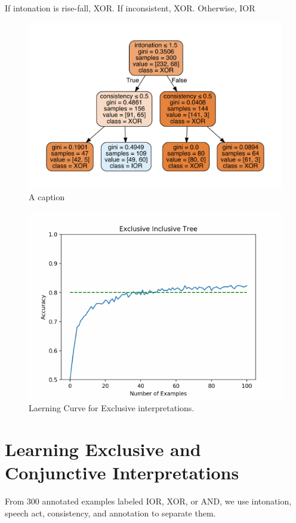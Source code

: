 \documentclass[oneside]{report}
\theoremstyle{definition}
\theoremstyle{definition}
\theoremstyle{definition}
\theoremstyle{remark}
\begin{document}
If intonation is rise-fall, XOR. \newline
If inconsistent, XOR. \newline
Otherwise, IOR \newline
\begin{figure}[tb]
\includegraphics[width=0.6\linewidth]{decision_trees/plots/exin} \caption{A caption}\label{fig:exorTree}
\end{figure}
\begin{figure}[tb]

{\centering \includegraphics{figs/exorLearning-1} 

}

\caption{Laerning Curve for Exclusive interpretations.}\label{fig:exorLearning}
\end{figure}
\section{Learning Exclusive and Conjunctive
Interpretations}\label{learning-exclusive-and-conjunctive-interpretations}

From 300 annotated examples labeled IOR, XOR, or AND, we use intonation,
speech act, consistency, and annotation to separate them. \newline
\end{document}
